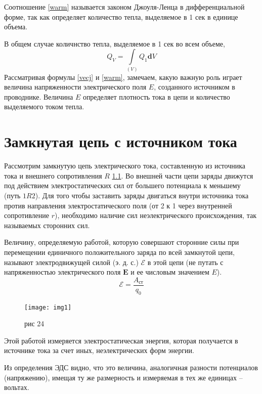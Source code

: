 \documentclass[a4paper,10pt]{book}
\begin{document}
Соотношение \ref{warm} называется законом Джоуля-Ленца в дифференциальной форме, так как определяет количество тепла, выделяемое в 1 сек в единице объема.

В общем случае количнство тепла, выделяемое в 1 сек во всем объеме,
\begin{equation}\label{warmVol}
 Q_V = \int\limits_{(V)}Q_1\mathbf{d}V
\end{equation}
Рассматривая формулы \ref{vecj} и \ref{warm}, замечаем, какую важную роль играет величина напряженности электрического поля $E$, созданного источником в проводнике. Величина $E$ определяет плотность тока в цепи и количество выделяемого током тепла.
\chapter{Замкнутая цепь с источником тока}
Рассмотрим замкнутую цепь электрического тока, составленную из источника тока и внешнего сопротивления $R$ \ref{img1}. Во внешней части цепи заряды движутся под действием электростатических сил от большего потенциала к меньшему (путь $1R2$). Для того чтобы заставить заряды двигаться внутри источника тока против направления электростатического поля (от 2 к 1 через внутренней сопротивление $r$), необходимо наличие сил неэлектрического происхождения, так называемых сторонних сил.

Величину, определяемую работой, которую совершают сторонние силы при перемещении единичного положительного заряда по всей замкнутой цепи, называют электродвижущей силой (э. д. с.) $\mathcal{E}$ в этой цепи (не путать с напряженностью электрического поля $\mathbf{E}$ и ее числовым значением $E$).
\begin{equation}\label{eds}
 \mathcal{E} = \frac{A_\text{ст}}{q_0}
\end{equation}
\begin{figure}[h]
\texttt{[image: img1]}
\caption{рис 24}
\label{img1}
\end{figure}
Этой работой измеряется электростатическая энергия, которая получается в источнике тока за счет иных, неэлектрических форм энергии.

Из определения ЭДС видно, что это величина, аналогичная разности потенциалов (напряжению), имещая ту же размерность и измеряемая в тех же
единицах -- вольтах.
\end{document}
